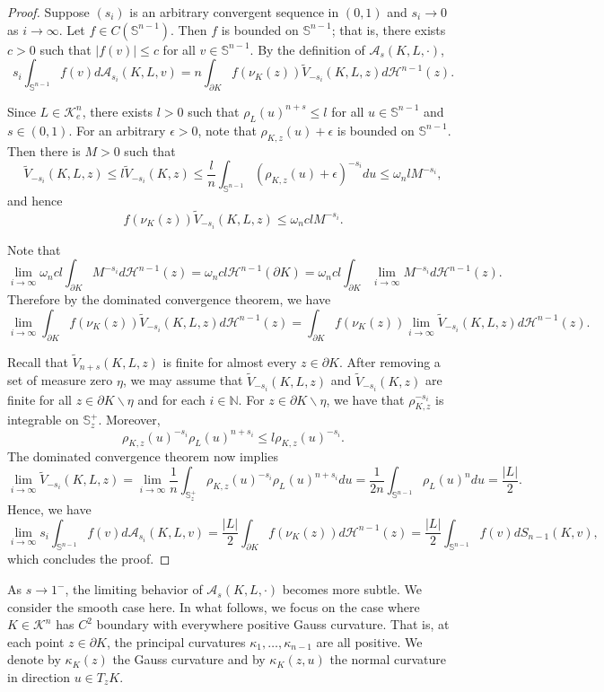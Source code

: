 \documentclass[12pt, oneside,reqno]{amsart}
\numberwithin{equation}{section}
\newtheorem{definition and theorem}[theorem]{Definition and Theorem}
\newcommand{\tA}{\mathcal{A}_s}
\theoremstyle{plain}
\theoremstyle{remark}
\theoremstyle{definition}
\newcommand{\sn}{{\mathbb S}^{n-1}}
\newcommand{\tk}{\mathcal{K}}
\newcommand{\tH}{\mathcal{H}}
\begin{document}
\begin{proof}
    Suppose $(s_i)$ is an arbitrary convergent sequence in $(0,1)$ and $s_i\rightarrow 0$ as $i\rightarrow \infty$. 
    Let $f\in C(\sn)$. Then $f$ is bounded on $\sn$; that is, there exists $c>0$ such that $|f(v)|\leq c$ for all $v\in\sn$. By the definition of $\tA(K,L,\cdot)$,
    \[s_i\int_{\sn}f(v)d{\mathcal A}_{s_i}(K,L,v)=n\int_{\partial K} f(\nu_K(z))\tilde{V}_{-s_i}(K,L,z)d\tH^{n-1}(z).\]
    
    Since $L\in\tk_e^n$, there exists $l>0$ such that
    $\rho_L(u)^{n+s}\leq l$ 
    for all $u\in\sn$ and $s\in(0,1)$. For an arbitrary $\epsilon>0$, note that $\rho_{K,z}(u)+\epsilon$ is bounded on $\sn$. Then there is $M>0$ such that
    \[\tilde{V}_{-s_i}(K,L,z)\leq l\tilde{V}_{-s_i}(K,z)\leq \frac{l}{n}\int_{\sn}(\rho_{K,z}(u)+\epsilon)^{-s_i}du \leq \omega_n lM^{-s_i}, \]
    and hence 
    \[f(\nu_K(z))\tilde{V}_{-s_i}(K,L,z)\leq \omega_n clM^{-s_i}.\]

    Note that
    \[\lim_{i\rightarrow\infty}\omega_n cl\int_{\partial K}M^{-s_i}d\tH^{n-1}(z)=\omega_n cl\tH^{n-1}(\partial K)=\omega_n cl\int_{\partial K}\lim_{i\rightarrow \infty}M^{-s_i}d\tH^{n-1}(z).\]
    Therefore by the dominated convergence theorem, we have
    \[\lim_{i\rightarrow\infty}\int_{\partial K} f(\nu_K(z))\tilde{V}_{-s_i}(K,L,z)d\tH^{n-1}(z)=\int_{\partial K}f(\nu_K(z))\lim_{i\rightarrow \infty} \tilde{V}_{-s_i}(K,L,z)d\tH^{n-1}(z).\]

    Recall that $\tilde{V}_{n+s}(K,L,z)$ is finite for almost every $z\in\partial K$. After removing a set of measure zero $\eta$, we may assume that $\tilde{V}_{-s_i}(K,L,z)$ and $\tilde{V}_{-s_i}(K,z)$ are finite for all $z\in\partial K\backslash \eta$ and for each $i\in\mathbb N$. For $z\in\partial K\backslash\eta$, we have that $\rho_{K,z}^{-s_i}$ is integrable on $\mathbb S_z^+$. Moreover, 
    \[\rho_{K,z}(u)^{-s_i}\rho_L(u)^{n+s_i}\leq l\rho_{K,z}(u)^{-s_i}.\]
    The dominated convergence theorem now implies
    \[\lim_{i\rightarrow \infty}\tilde{V}_{-s_i}(K,L,z)=\lim_{i\rightarrow\infty}\frac{1}{n}\int_{\mathbb S_z^+}\rho_{K,z}(u)^{-s_i}\rho_L(u)^{n+s_i}du=\frac{1}{2n}\int_{\sn}\rho_{L}(u)^{n}du=\frac{|L|}{2}.\]
    Hence, we have
    \[\lim_{i\rightarrow\infty}s_i\int_{\sn}f(v)d{\mathcal A}_{s_i}(K,L,v)=\frac{|L|}{2}\int_{\partial K}f(\nu_K(z))d\tH^{n-1}(z)=\frac{|L|}{2}\int_{\sn}f(v)dS_{n-1}(K,v),\]
    which concludes the proof.
\end{proof}

{As $s\rightarrow 1^-$, the limiting behavior of $\tA(K,L,\cdot)$ becomes more subtle. We consider the smooth case here.} In what follows, we focus on the case where $K\in\tk^n$ has $C^2$ boundary with everywhere positive Gauss curvature. That is, at each point $z\in\partial K$, the principal curvatures $\kappa_1,\ldots, \kappa_{n-1}$ are all positive. We denote by $\kappa_K(z)$ the Gauss curvature and by $\kappa_K(z,u)$ the normal curvature in direction $u\in T_z K$.
\end{document}
